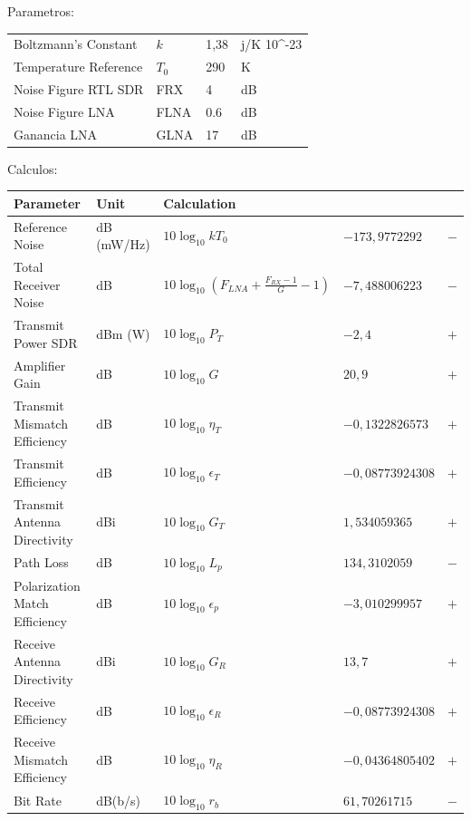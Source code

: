 \documentclass[12pt,a4paper]{article}
\newcounter{none} %
\begin{document}
Parametros:

{\def\LTcaptype{none} %
\begin{longtable}[]{@{}llll@{}}
\toprule\noalign{}
\endhead
\bottomrule\noalign{}
\endlastfoot
Boltzmann's Constant & \(k\) & 1,38 & j/K 10\^{}-23 \\
Temperature Reference & \(T_{0}\) & 290 & K \\
Noise Figure RTL SDR & FRX & 4 & dB \\
Noise Figure LNA & FLNA & 0.6 & dB \\
Ganancia LNA & GLNA & 17 & dB \\
\end{longtable}
}

Calculos:

{\def\LTcaptype{none} %
\begin{longtable}[]{@{}
  >{\raggedright\arraybackslash}p{}
  >{\raggedright\arraybackslash}p{}
  >{\raggedright\arraybackslash}p{}
  >{\raggedleft\arraybackslash}p{}
  >{\centering\arraybackslash}p{}@{}}
\toprule\noalign{}
\textbf{Parameter} & \textbf{Unit} & \textbf{Calculation} & & \\
\midrule\noalign{}
\endhead
\bottomrule\noalign{}
\endlastfoot
Reference Noise & dB (mW/Hz) & $10\log_{10} kT_0$ & $-173{,}9772292$ & $-$ \\
Total Receiver Noise & dB & $10\log_{10}\left(F_{LNA} + \frac{F_{RX}-1}{G} - 1\right)$ & $-7{,}488006223$ & $-$ \\
Transmit Power SDR & dBm (W) & $10\log_{10} P_T$  & $-2{,}4$ & $+$ \\
Amplifier Gain & dB & $10\log_{10} G$ & $20{,}9$ & $+$ \\
Transmit Mismatch Efficiency & dB & $10\log_{10} \eta_T$ & $-0{,}1322826573$ & $+$ \\
Transmit Efficiency & dB & $10\log_{10} \epsilon_T$ & $-0{,}08773924308$ & $+$ \\
Transmit Antenna Directivity & dBi & $10\log_{10} G_T$ & $1{,}534059365$ & $+$ \\
Path Loss & dB & $10\log_{10} L_p$ & $134{,}3102059$ & $-$ \\
Polarization Match Efficiency & dB & $10\log_{10} \epsilon_p$ & $-3{,}010299957$ & $+$ \\
Receive Antenna Directivity & dBi & $10\log_{10} G_R$ & $13{,}7$ & $+$ \\
Receive Efficiency & dB & $10\log_{10} \epsilon_R$ & $-0{,}08773924308$ & $+$ \\
Receive Mismatch Efficiency & dB & $10\log_{10} \eta_R$ & $-0{,}04364805402$ & $+$ \\
Bit Rate & dB(b/s) & $10\log_{10} r_b$ & $61{,}70261715$ & $-$ \\
\end{longtable}
}
\end{document}
